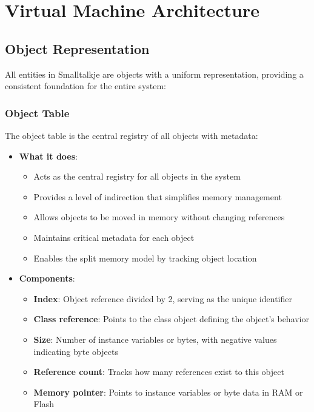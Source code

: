 \documentclass[12pt,a4paper]{report}
\begin{document}
\chapter{Virtual Machine Architecture}

\section{Object Representation}
All entities in Smalltalkje are objects with a uniform representation, providing a consistent foundation for the entire system:

\subsection{Object Table}
The object table is the central registry of all objects with metadata:

\begin{itemize}
    \item \textbf{What it does}:
    \begin{itemize}
        \item Acts as the central registry for all objects in the system
        \item Provides a level of indirection that simplifies memory management
        \item Allows objects to be moved in memory without changing references
        \item Maintains critical metadata for each object
        \item Enables the split memory model by tracking object location
    \end{itemize}
    
    \item \textbf{Components}:
    \begin{itemize}
        \item \textbf{Index}: Object reference divided by 2, serving as the unique identifier
        \item \textbf{Class reference}: Points to the class object defining the object's behavior
        \item \textbf{Size}: Number of instance variables or bytes, with negative values indicating byte objects
        \item \textbf{Reference count}: Tracks how many references exist to this object
        \item \textbf{Memory pointer}: Points to instance variables or byte data in RAM or Flash
    \end{itemize}
\end{itemize}
\end{document}
